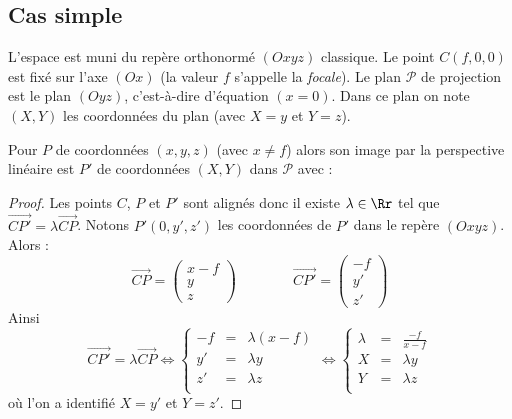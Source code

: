 \documentclass[11pt,class=report,crop=false]{standalone}
\begin{document}


\subsection{Cas simple}

L'espace est muni du repère orthonormé $(Oxyz)$ classique.
Le point $C(f,0,0)$ est fixé sur l'axe $(Ox)$ (la valeur $f$ s'appelle la \emph{focale}).
Le plan $\mathcal{P}$ de projection est le plan $(Oyz)$, c'est-à-dire d'équation $(x=0)$. Dans ce plan on note $(X,Y)$ les coordonnées du plan (avec $X=y$ et $Y=z$).



\begin{proposition}
Pour $P$ de coordonnées $(x,y,z)$ (avec $x \neq f$) alors son image par la perspective linéaire est $P'$ de coordonnées $(X,Y)$ dans $\mathcal{P}$ avec :
\end{proposition}


\begin{proof}
Les points $C$, $P$ et $P'$ sont alignés donc il existe $\lambda \in \Rr$ tel que $\overrightarrow{CP'} = \lambda \overrightarrow{CP}$.
Notons $P'(0,y',z')$ les coordonnées de $P'$ dans le repère $(Oxyz)$. Alors :
$$
\overrightarrow{CP} = \begin{pmatrix}x-f\\y\\z\end{pmatrix}
\qquad\qquad
\overrightarrow{CP'} = \begin{pmatrix}-f\\y'\\z'\end{pmatrix}$$
Ainsi
$$\overrightarrow{CP'} = \lambda \overrightarrow{CP}
\iff
\left\{\begin{array}{rcl}
-f &=& \lambda (x-f) \\
y'  &=& \lambda y \\
z' &=& \lambda z \\
\end{array}\right.
\iff
\left\{\begin{array}{rcl}
\lambda &=&  \frac{-f}{x-f} \\
X &=& \lambda y \\
Y &=& \lambda z \\
\end{array}\right.$$
où l'on a identifié $X=y'$ et $Y=z'$.
\end{proof}
\end{document}
